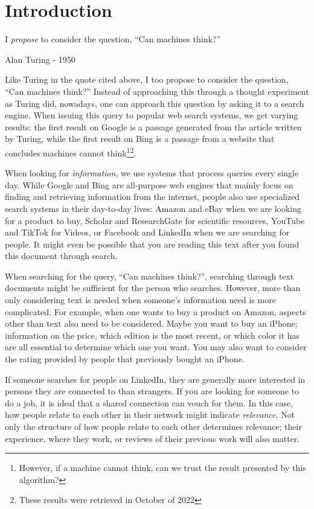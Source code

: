 \chapter{Introduction}
\label{chp:introduction}
\epigraph{I \textit{propose} to consider the question, ``Can machines think?''}{Alan Turing - 1950}

Like Turing in the quote cited above, I too propose to consider the question, ``Can machines think?'' Instead of approaching this through a thought experiment as Turing did, nowadays, one can approach this question by asking it to a search engine. When issuing this query to popular web search systems, we get varying results: the first result on Google is a passage generated from the article written by Turing, while the first result on Bing is a passage from a website that concludes machines cannot think\footnote{However, if a machine cannot think, can we trust the result presented by this algorithm?}\footnote{These results were retrieved in October of 2022}.

When looking for \textit{information}, we use systems that process queries every single day. While Google and Bing are all-purpose web engines that mainly focus on finding and retrieving information from the internet, people also use specialized search systems in their day-to-day lives: Amazon and eBay when we are looking for a product to buy, Scholar and ResearchGate for scientific resources, YouTube and TikTok for Videos, or Facebook and LinkedIn when we are searching for people. It might even be possible that you are reading this text after you found this document through search. 

When searching for the query, ``Can machines think?'', searching through text documents might be sufficient for the person who searches. However, more than only considering text is needed when someone's information need is more complicated. For example, when one wants to buy a product on Amazon, aspects other than text also need to be considered. Maybe you want to buy an iPhone; information on the price, which edition is the most recent, or which color it has are all essential to determine which one you want. You may also want to consider the rating provided by people that previously bought an iPhone.

If someone searches for people on LinkedIn, they are generally more interested in persons they are connected to than strangers. If you are looking for someone to do a job, it is ideal that a shared connection can vouch for them. In this case, how people relate to each other in their network might indicate \textit{relevance}. Not only the structure of how people relate to each other determines relevance; their experience, where they work, or reviews of their previous work will also matter.

